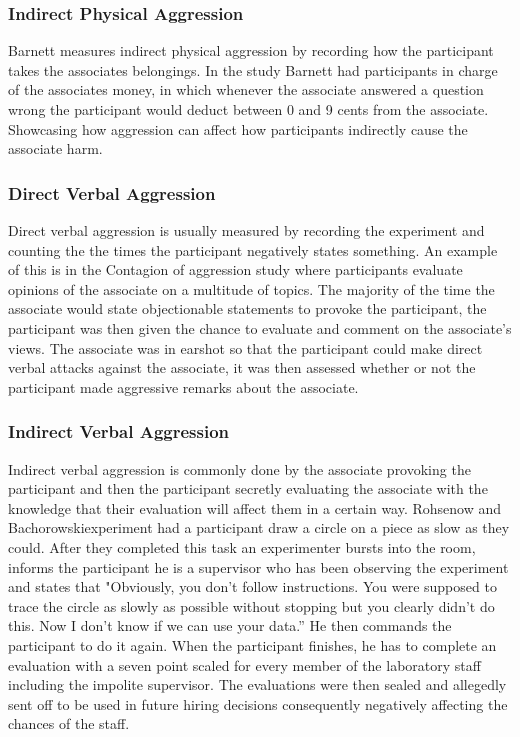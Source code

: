 \documentclass[journal]{IEEEtran}
\begin{document}
    \subsubsection{Indirect Physical Aggression}
        Barnett measures indirect physical aggression by recording how the participant takes the associates belongings\cite{Barnett}. In the study Barnett had participants in charge of the associates money, in which whenever the associate answered a question wrong the participant would deduct between 0 and 9 cents from the associate. Showcasing how aggression can affect how participants indirectly cause the associate harm.

    \subsubsection{Direct Verbal Aggression}
        Direct verbal aggression is usually measured by recording the experiment and counting the the times the participant negatively states something. An example of this is in the Contagion of aggression study where participants evaluate opinions of the associate on a multitude of topics\cite{Wheeler}. The majority of the time the associate would state objectionable statements to provoke the participant, the participant was then given the chance to evaluate and comment on the associate's views. The associate was in earshot so that the participant could make direct verbal attacks against the associate, it was then assessed whether or not the participant made aggressive remarks about the associate.

    \subsubsection{Indirect Verbal Aggression}
        Indirect verbal aggression is commonly done by the associate provoking the participant and then the participant secretly evaluating the associate with the knowledge that their evaluation will affect them in a certain way. Rohsenow and Bachorowskiexperiment had a participant draw a circle on a piece as slow as they could\cite{Rohsenow}. After they completed this task an experimenter bursts into the room, informs the participant he is a supervisor who has been observing the experiment and states that "Obviously, you don't follow instructions. You were supposed to trace the circle as slowly as possible without stopping but you clearly didn't do this. Now I don't know if we can use your data.” He then commands the participant to do it again. When the participant finishes, he has to complete an evaluation with a seven point scaled for every member of the laboratory staff including the impolite supervisor. The evaluations were then sealed and allegedly sent off to be used in future hiring decisions consequently negatively affecting the chances of the staff.
\end{document}
